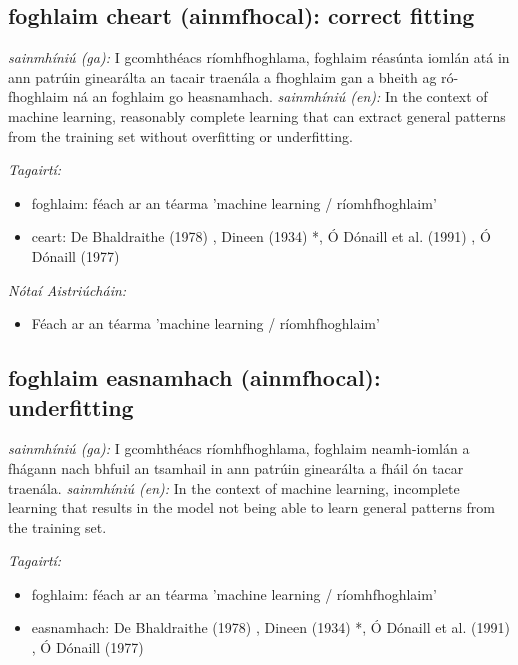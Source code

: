 \documentclass{article}
\begin{document}
\subsection*{foghlaim cheart (ainmfhocal): correct fitting} 
 \noindent \textit{sainmhíniú (ga):} I gcomhthéacs ríomhfhoghlama, foghlaim réasúnta iomlán atá in ann patrúin ginearálta an tacair traenála a fhoghlaim gan a bheith ag ró-fhoghlaim ná an foghlaim go heasnamhach.
\newline\newline
 \noindent \textit{sainmhíniú (en):} In the context of machine learning, reasonably complete learning that can extract general patterns from the training set without overfitting or underfitting.
\newline

 \noindent \textit{Tagairtí:}
\begin{itemize}
	\item foghlaim: féach ar an téarma 'machine learning / ríomhfhoghlaim'
	\item ceart: De Bhaldraithe (1978) \cite{de-bhaldraithe}, Dineen (1934) \cite{dineen}*, Ó Dónaill et al. (1991) \cite{focloir-beag}, Ó Dónaill (1977) \cite{odonaill}
\end{itemize}

 \noindent \textit{Nótaí Aistriúcháin:}
\begin{itemize}
	\item Féach ar an téarma 'machine learning / ríomhfhoghlaim'
\end{itemize}


\subsection*{foghlaim easnamhach (ainmfhocal): underfitting} 
 \noindent \textit{sainmhíniú (ga):} I gcomhthéacs ríomhfhoghlama, foghlaim neamh-iomlán a fhágann nach bhfuil an tsamhail in ann patrúin ginearálta a fháil ón tacar traenála.
\newline\newline
 \noindent \textit{sainmhíniú (en):} In the context of machine learning, incomplete learning that results in the model not being able to learn general patterns from the training set.
\newline

 \noindent \textit{Tagairtí:}
\begin{itemize}
	\item foghlaim: féach ar an téarma 'machine learning / ríomhfhoghlaim'
	\item easnamhach: De Bhaldraithe (1978) \cite{de-bhaldraithe}, Dineen (1934) \cite{dineen}*, Ó Dónaill et al. (1991) \cite{focloir-beag}, Ó Dónaill (1977) \cite{odonaill}
\end{itemize}
\end{document}
